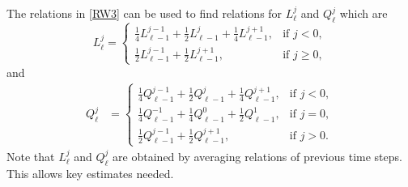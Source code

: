 \documentclass[11pt]{amsart}
\begin{document}
The relations in \eqref{RW3} can be used to find relations for $L^j_\ell$ and $Q^j_\ell$ which are
\begin{equation} \label{eq:L}
L^j_\ell = \left\{\begin{array}{ll}
        \frac{1}{4}L_{\ell-1}^{j-1} + \frac{1}{2}L_{\ell-1}^j +
        \frac{1}{4}L_{\ell-1}^{j+1}, & \text{if $j<0$},\\
        \frac{1}{2}L_{\ell-1}^{j-1} + \frac{1}{2}L_{\ell-1}^{j+1}, &
        \text{if $j\ge0$},
        \end{array}\right.
\end{equation}
and
\begin{equation}\label{eq:Q}
\begin{aligned}
Q^j_\ell %
&=\left\{\begin{array}{ll}
        \frac{1}{4}Q_{\ell-1}^{j-1} + \frac{1}{2}Q_{\ell-1}^{j} +
        \frac{1}{4}Q_{\ell-1}^{j+1}, & \text{if $j<0$},\\
        \frac{1}{4}Q_{\ell-1}^{-1} + \frac{1}{4}Q_{\ell-1}^{0} +
        \frac{1}{2}Q_{\ell-1}^{1}, & \text{if $j=0$},\\
        \frac{1}{2}Q_{\ell-1}^{j-1} + \frac{1}{2}Q_{\ell-1}^{j+1}, &
        \text{if $j>0$}.
        \end{array}\right.
 \end{aligned}
\end{equation}
Note that $L^j_\ell$ and $Q^j_\ell$ are obtained by averaging relations of previous time steps. This allows key estimates needed.
\end{document}

